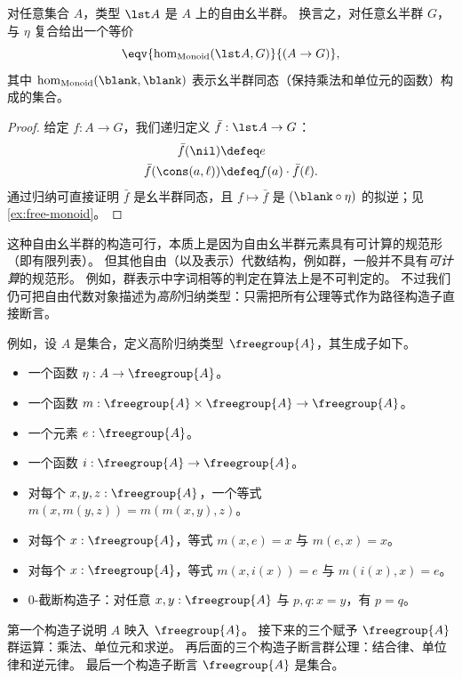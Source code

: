 \begin{lem}\label{thm:free-monoid}
  对任意集合 $A$，类型 $\lst A$ 是 $A$ 上的自由幺半群。
  换言之，对任意幺半群 $G$，与 $\eta$ 复合给出一个等价
  \[ \eqv{\hom_{\mathrm{Monoid}}(\lst A,G)}{(A\to G)}, \]
  其中 $\hom_{\mathrm{Monoid}}(\blank,\blank)$ 表示幺半群同态（保持乘法和单位元的函数）构成的集合。
\end{lem}
\begin{proof}
  给定 $f:A\to G$，我们递归定义 $\bar{f}:\lst A \to G$：
  \begin{align*}
    \bar{f}(\nil) &\defeq e\\
    \bar{f}(\cons(a,\ell)) &\defeq f(a) \cdot \bar{f}(\ell).
  \end{align*}
  通过归纳可直接证明 $\bar{f}$ 是幺半群同态，且 $f\mapsto \bar f$ 是 $(\blank\circ \eta)$ 的拟逆；见 \cref{ex:free-monoid}。
\end{proof}

%

这种自由幺半群的构造可行，本质上是因为自由幺半群元素具有可计算的规范形（即有限列表）。
但其他自由（以及表示）代数结构，例如群，一般并不具有\emph{可计算}的规范形。
例如，群表示中字词相等的判定在算法上是不可判定的。
不过我们仍可把自由代数对象描述为\emph{高阶}归纳类型：只需把所有公理等式作为路径构造子直接断言。

%
%
例如，设 $A$ 是集合，定义高阶归纳类型 $\freegroup{A}$，其生成子如下。
\begin{itemize}
\item 一个函数 $\eta:A\to \freegroup{A}$。
\item 一个函数 $m: \freegroup{A} \times \freegroup{A} \to \freegroup{A}$。
\item 一个元素 $e:\freegroup{A}$。
\item 一个函数 $i:\freegroup{A} \to \freegroup{A}$。
\item 对每个 $x,y,z:\freegroup{A}$，一个等式 $m(x,m(y,z)) = m(m(x,y),z)$。
\item 对每个 $x:\freegroup{A}$，等式 $m(x,e) = x$ 与 $m(e,x) = x$。
\item 对每个 $x:\freegroup{A}$，等式 $m(x,i(x)) = e$ 与 $m(i(x),x) = e$。
\item $0$-截断构造子：对任意 $x,y:\freegroup{A}$ 与 $p,q:x=y$，有 $p=q$。
\end{itemize}
第一个构造子说明 $A$ 映入 $\freegroup{A}$。
接下来的三个赋予 $\freegroup{A}$ 群运算：乘法、单位元和求逆。
再后面的三个构造子断言群公理：结合律、单位律和逆元律。
最后一个构造子断言 $\freegroup{A}$ 是集合。

